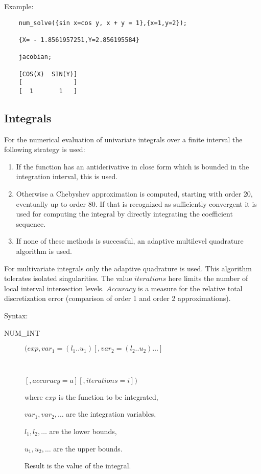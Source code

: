 Example:
\begin{verbatim}
    num_solve({sin x=cos y, x + y = 1},{x=1,y=2});

    {X= - 1.8561957251,Y=2.856195584}

    jacobian;

    [COS(X)  SIN(Y)]
    [              ]
    [  1       1   ]
\end{verbatim}

\subsection{Integrals}

For the numerical evaluation of univariate integrals over a finite
interval the following strategy is used:
\begin{enumerate}
\item If the function has an antiderivative in close form
    which is bounded in the integration interval, this
    is used.
\item Otherwise a Chebyshev approximation is computed,
    starting with order 20, eventually up to order 80.
    If that is recognized as sufficiently convergent
    it is used for computing the integral by directly
    integrating the coefficient sequence.
\item If none of these methods is successful, an
    adaptive multilevel quadrature algorithm is used.
\end{enumerate}
For multivariate integrals only the adaptive quadrature is used.
This algorithm tolerates isolated singularities.
The value $iterations$ here limits the number of
local interval intersection levels.
$Accuracy$ is a measure for the relative total discretization
error (comparison of order 1 and order 2 approximations).

Syntax:

\begin{description}
\item[NUM\_INT] $(exp,var_1=(l_1 .. u_1)[,var_2=(l_2 .. u_2)\ldots]$
\item[\ \ \ \ \ \ ]$[,accuracy=a][,iterations=i])$

where $exp$ is the function to be integrated,

$var_1, var_2 , \ldots$ are the integration variables,

$l_1, l_2 , \ldots$ are the lower bounds,

$u_1, u_2 , \ldots$ are the upper bounds.

Result is the value of the integral.

\end{description}


